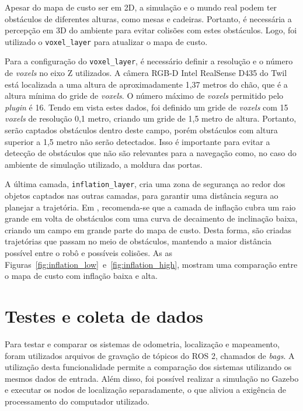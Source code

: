 \documentclass[repeatfields,xlists,xpacks,oneside,yearsonly]{ufrgscca}
\begin{document}
Apesar do mapa de custo ser em 2D, a simulação e o mundo real podem ter obstáculos
de diferentes alturas, como mesas e cadeiras. Portanto, é necessária a percepção em 
3D do ambiente para evitar colisões com estes obstáculos. Logo, foi utilizado o
\texttt{voxel\_layer} para atualizar o mapa de custo.

Para a configuração do \texttt{voxel\_layer}, é necessário definir a resolução
e o número de \textit{voxels} no eixo Z utilizados. 
A câmera RGB-D Intel RealSense D435 do Twil está localizada a uma altura de aproximadamente
1,37 metros do chão, que é a altura mínima do gride de \textit{voxels}.
O número máximo de \textit{voxels} permitido pelo \textit{plugin} é 16.
Tendo em vista estes dados, foi definido um gride de \textit{voxels} com 15 \textit{voxels}
de resolução 0,1 metro, criando um gride de 1,5 metro de altura.
Portanto, serão captados obstáculos dentro deste campo, porém obstáculos com altura
superior a 1,5 metro não serão detectados.
Isso é importante para evitar a detecção de obstáculos que não são relevantes para
a navegação como, no caso do ambiente de simulação utilizado, a moldura das portas.


A última camada, \texttt{inflation\_layer}, cria uma zona de segurança ao redor
dos objetos captados nas outras camadas, para garantir uma distância segura
ao planejar a trajetória.
Em \textcite{ros_tuning_guide}, recomenda-se que a camada de inflação cubra 
um raio grande em volta de obstáculos com uma curva de decaimento de
inclinação baixa, criando um campo em grande parte do mapa de custo.
Desta forma, são criadas trajetórias que passam no meio de obstáculos, 
mantendo a maior distância possível entre o robô e possíveis colisões.
As as Figuras~\ref{fig:inflation_low}~e~\ref{fig:inflation_high}, mostram
uma comparação entre o mapa de custo com inflação baixa e alta.

\section{Testes e coleta de dados}
\label{met:testes}

Para testar e comparar os sistemas de odometria, localização e mapeamento,
foram utilizados arquivos de gravação de tópicos do ROS 2, chamados de 
\textit{bags}.
A utilização desta funcionalidade permite a comparação dos sistemas 
utilizando os mesmos dados de entrada.
Além disso, foi possível realizar a simulação no Gazebo e executar os nodos 
de localização separadamente, o que aliviou a exigência de processamento
do computador utilizado.
\end{document}
